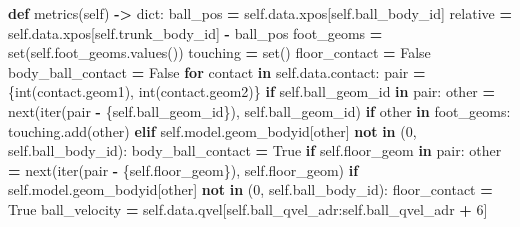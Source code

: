 \documentclass[
  american,
  11pt,
  letterpaper,
]{article}
\newenvironment{Shaded}{\begin{snugshade}}{\end{snugshade}}
\newcommand{\BuiltInTok}[1]{#1}
\newcommand{\ControlFlowTok}[1]{\textcolor[rgb]{0.13,0.29,0.53}{\textbf{#1}}}
\newcommand{\DecValTok}[1]{\textcolor[rgb]{0.00,0.00,0.81}{#1}}
\newcommand{\KeywordTok}[1]{\textcolor[rgb]{0.13,0.29,0.53}{\textbf{#1}}}
\newcommand{\NormalTok}[1]{#1}
\newcommand{\OperatorTok}[1]{\textcolor[rgb]{0.81,0.36,0.00}{\textbf{#1}}}
\newcommand{\VariableTok}[1]{\textcolor[rgb]{0.00,0.00,0.00}{#1}}
\renewenvironment{Shaded}{\par\smallskip}{\par\smallskip}
\begin{document}
\begin{Shaded}
\begin{Highlighting}[]
    \KeywordTok{def}\NormalTok{ metrics(}\VariableTok{self}\NormalTok{) }\OperatorTok{{-}\textgreater{}} \BuiltInTok{dict}\NormalTok{:}
\NormalTok{        ball\_pos }\OperatorTok{=} \VariableTok{self}\NormalTok{.data.xpos[}\VariableTok{self}\NormalTok{.ball\_body\_id]}
\NormalTok{        relative }\OperatorTok{=} \VariableTok{self}\NormalTok{.data.xpos[}\VariableTok{self}\NormalTok{.trunk\_body\_id] }\OperatorTok{{-}}\NormalTok{ ball\_pos}
\NormalTok{        foot\_geoms }\OperatorTok{=} \BuiltInTok{set}\NormalTok{(}\VariableTok{self}\NormalTok{.foot\_geoms.values())}
\NormalTok{        touching }\OperatorTok{=} \BuiltInTok{set}\NormalTok{()}
\NormalTok{        floor\_contact }\OperatorTok{=} \VariableTok{False}
\NormalTok{        body\_ball\_contact }\OperatorTok{=} \VariableTok{False}
        \ControlFlowTok{for}\NormalTok{ contact }\KeywordTok{in} \VariableTok{self}\NormalTok{.data.contact:}
\NormalTok{            pair }\OperatorTok{=}\NormalTok{ \{}\BuiltInTok{int}\NormalTok{(contact.geom1), }\BuiltInTok{int}\NormalTok{(contact.geom2)\}}
            \ControlFlowTok{if} \VariableTok{self}\NormalTok{.ball\_geom\_id }\KeywordTok{in}\NormalTok{ pair:}
\NormalTok{                other }\OperatorTok{=} \BuiltInTok{next}\NormalTok{(}\BuiltInTok{iter}\NormalTok{(pair }\OperatorTok{{-}}\NormalTok{ \{}\VariableTok{self}\NormalTok{.ball\_geom\_id\}), }\VariableTok{self}\NormalTok{.ball\_geom\_id)}
                \ControlFlowTok{if}\NormalTok{ other }\KeywordTok{in}\NormalTok{ foot\_geoms:}
\NormalTok{                    touching.add(other)}
                \ControlFlowTok{elif} \VariableTok{self}\NormalTok{.model.geom\_bodyid[other] }\KeywordTok{not} \KeywordTok{in}\NormalTok{ (}\DecValTok{0}\NormalTok{, }\VariableTok{self}\NormalTok{.ball\_body\_id):}
\NormalTok{                    body\_ball\_contact }\OperatorTok{=} \VariableTok{True}
            \ControlFlowTok{if} \VariableTok{self}\NormalTok{.floor\_geom }\KeywordTok{in}\NormalTok{ pair:}
\NormalTok{                other }\OperatorTok{=} \BuiltInTok{next}\NormalTok{(}\BuiltInTok{iter}\NormalTok{(pair }\OperatorTok{{-}}\NormalTok{ \{}\VariableTok{self}\NormalTok{.floor\_geom\}), }\VariableTok{self}\NormalTok{.floor\_geom)}
                \ControlFlowTok{if} \VariableTok{self}\NormalTok{.model.geom\_bodyid[other] }\KeywordTok{not} \KeywordTok{in}\NormalTok{ (}\DecValTok{0}\NormalTok{, }\VariableTok{self}\NormalTok{.ball\_body\_id):}
\NormalTok{                    floor\_contact }\OperatorTok{=} \VariableTok{True}
\NormalTok{        ball\_velocity }\OperatorTok{=} \VariableTok{self}\NormalTok{.data.qvel[}\VariableTok{self}\NormalTok{.ball\_qvel\_adr:}\VariableTok{self}\NormalTok{.ball\_qvel\_adr }\OperatorTok{+} \DecValTok{6}\NormalTok{]}

\end{Highlighting}
\end{Shaded}
\end{document}

